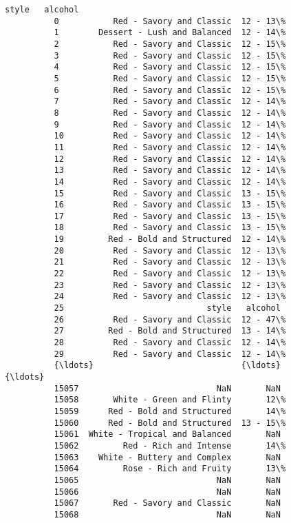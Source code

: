 \documentclass[11pt]{article}
\begin{document}
\begin{Verbatim}[commandchars=\\\{\}]
                                         style   alcohol  
          0           Red - Savory and Classic  12 - 13\%  
          1        Dessert - Lush and Balanced  12 - 14\%  
          2           Red - Savory and Classic  12 - 15\%  
          3           Red - Savory and Classic  12 - 15\%  
          4           Red - Savory and Classic  12 - 15\%  
          5           Red - Savory and Classic  12 - 15\%  
          6           Red - Savory and Classic  12 - 15\%  
          7           Red - Savory and Classic  12 - 14\%  
          8           Red - Savory and Classic  12 - 14\%  
          9           Red - Savory and Classic  12 - 14\%  
          10          Red - Savory and Classic  12 - 14\%  
          11          Red - Savory and Classic  12 - 14\%  
          12          Red - Savory and Classic  12 - 14\%  
          13          Red - Savory and Classic  12 - 14\%  
          14          Red - Savory and Classic  12 - 14\%  
          15          Red - Savory and Classic  13 - 15\%  
          16          Red - Savory and Classic  13 - 15\%  
          17          Red - Savory and Classic  13 - 15\%  
          18          Red - Savory and Classic  13 - 15\%  
          19         Red - Bold and Structured  12 - 14\%  
          20          Red - Savory and Classic  12 - 13\%  
          21          Red - Savory and Classic  12 - 13\%  
          22          Red - Savory and Classic  12 - 13\%  
          23          Red - Savory and Classic  12 - 13\%  
          24          Red - Savory and Classic  12 - 13\%  
          25                             style   alcohol  
          26          Red - Savory and Classic  12 - 47\%  
          27         Red - Bold and Structured  13 - 14\%  
          28          Red - Savory and Classic  12 - 14\%  
          29          Red - Savory and Classic  12 - 14\%  
          {\ldots}                              {\ldots}       {\ldots}  
          15057                            NaN       NaN  
          15058       White - Green and Flinty       12\%  
          15059      Red - Bold and Structured       14\%  
          15060      Red - Bold and Structured  13 - 15\%  
          15061  White - Tropical and Balanced       NaN  
          15062         Red - Rich and Intense       14\%  
          15063    White - Buttery and Complex       NaN  
          15064         Rose - Rich and Fruity       13\%  
          15065                            NaN       NaN  
          15066                            NaN       NaN  
          15067       Red - Savory and Classic       NaN  
          15068                            NaN       NaN  

\end{Verbatim}
\end{document}
